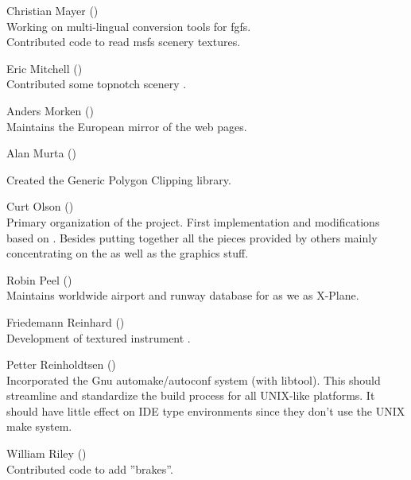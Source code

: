 \noindent Christian Mayer ()\\
 Working on multi-lingual conversion tools for fgfs.\\
 Contributed code to read msfs scenery textures.
 \medskip

\noindent Eric Mitchell ()\\
  Contributed some topnotch scenery .
 \medskip

\noindent Anders Morken ()\\
  Maintains the European mirror of the \FlightGear web pages.
 \medskip

\noindent Alan Murta ()


  \noindent
  Created the Generic Polygon Clipping library.
 \medskip

\noindent Curt Olson ()\\
 Primary organization of the project. First implementation
 and modifications based on . Besides putting together all
 the pieces provided by others mainly concentrating on the  as well as the graphics stuff.
 \medskip

\noindent Robin Peel ()\\
  Maintains worldwide airport and runway database for \FlightGear as we as X-Plane.
 \medskip


\noindent Friedemann Reinhard
()\\
  Development of textured instrument .
 \medskip

\noindent Petter Reinholdtsen ()\\
  Incorporated the Gnu automake/autoconf system (with libtool).
  This should streamline and standardize the build process for all
  UNIX-like platforms.  It should have little effect on IDE type
  environments since they don't use the UNIX make system.
 \medskip

\noindent William Riley ()\\
  Contributed code to add ''brakes''.
 \medskip

